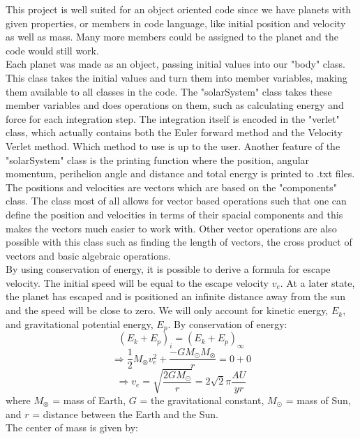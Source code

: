 \documentclass[10pt,a4paper]{article}
\begin{document}
\noindent This project is well suited for an object oriented code since we have planets with given properties, or members in code language, like initial position and velocity as well as mass. Many more members could be assigned to the planet and the code would still work. \\


\noindent Each planet was made as an object, passing initial values into our "body" class. This class takes the initial values and turn them into member variables, making them available to all classes in the code. The "solarSystem" class takes these member variables and does operations on them, such as calculating energy and force for each integration step. The integration itself is encoded in the "verlet" class, which actually contains both the Euler forward method and the Velocity Verlet method. Which method to use is up to the user. Another feature of the "solarSystem" class is the printing function where the position, angular momentum, perihelion angle and distance and total energy is printed to .txt files.\\


\noindent The positions and velocities are vectors which are based on the "components" class. The class most of all allows for vector based operations such that one can define the position and velocities in terms of their spacial components and this makes the vectors much easier to work with. Other vector operations are also possible with this class such as finding the length of vectors, the cross product of vectors and basic algebraic operations.\\

\noindent By using conservation of energy, it is possible to derive a formula for escape velocity. The initial speed will be equal to the escape velocity $v_e$. At a later state, the planet has escaped and is positioned an infinite distance away from the sun and the speed will be close to zero. We will only account for kinetic energy, $E_k$, and gravitational potential energy, $E_p$. By conservation of energy: 
$$(E_k+E_p)_i = (E_k+E_p)_{\infty}$$
$$\Rightarrow \frac{1}{2}M_{\otimes}v_e^2 + \frac{-GM_{\odot}M_{\otimes}}{r} = 0 + 0$$
$$\Rightarrow v_e = \sqrt{\frac{2GM_{\odot}}{r}} = 2\sqrt{2}\pi \frac{AU}{yr}$$
where $M_{\otimes}$ = mass of Earth, $G$ = the gravitational constant, $M_{\odot}$ = mass of Sun, and $r$ = distance between the Earth and the Sun.\\


\noindent The center of mass is given by:
\end{document}
